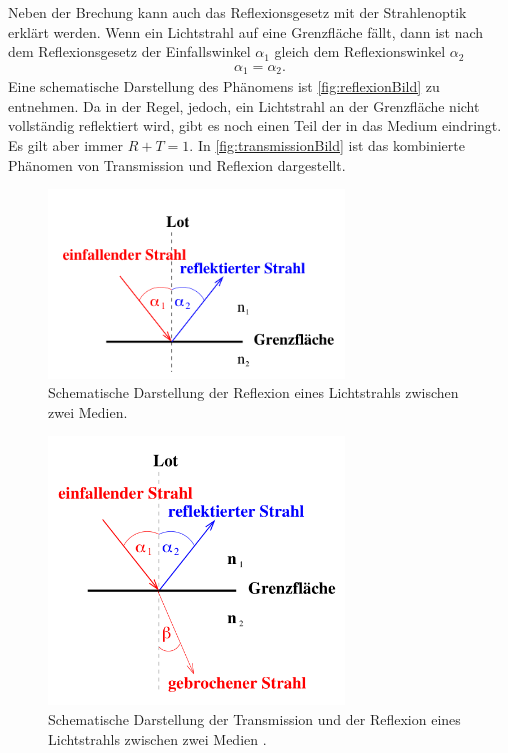 \noindent
Neben der Brechung kann auch das Reflexionsgesetz mit der Strahlenoptik erklärt werden. Wenn ein Lichtstrahl auf eine Grenzfläche fällt, dann ist nach dem Reflexionsgesetz der Einfallswinkel $\alpha_1$ gleich dem Reflexionswinkel $\alpha_2$
\begin{align}
    \label{eqn:einfallAusfall}
    \alpha_1 = \alpha_2.
\end{align}
Eine schematische Darstellung des Phänomens ist \autoref{fig:reflexionBild} zu entnehmen. \newline
Da in der Regel, jedoch, ein Lichtstrahl an der Grenzfläche nicht vollständig reflektiert wird, gibt es noch einen Teil der in das Medium eindringt. Es gilt aber immer $R+T=1$.
In \autoref{fig:transmissionBild} ist das kombinierte Phänomen von Transmission und Reflexion dargestellt.

\begin{figure}[H]
    \centering
    \includegraphics[width=0.7\textwidth]{data/reflexion.png}
    \caption{Schematische Darstellung der Reflexion eines Lichtstrahls zwischen zwei Medien\cite{Anleitung400}.}
    \label{fig:reflexionBild}
\end{figure}

\begin{figure}[H]
    \centering
    \includegraphics[width=0.7\textwidth]{data/transmission.png}
    \caption{Schematische Darstellung der Transmission und der Reflexion eines Lichtstrahls zwischen zwei Medien \cite{Anleitung400}.}
    \label{fig:transmissionBild}
\end{figure}

